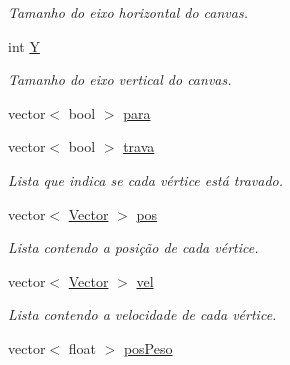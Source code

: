 \begin{DoxyCompactItemize}
\begin{DoxyCompactList}\small\item\em Tamanho do eixo horizontal do canvas. \end{DoxyCompactList}\item 
\mbox{\label{classGraphDisplay_a25ae3eec2c8103a827aefcd5a44be825}} 
int \hyperlink{classGraphDisplay_a25ae3eec2c8103a827aefcd5a44be825}{Y}
\begin{DoxyCompactList}\small\item\em Tamanho do eixo vertical do canvas. \end{DoxyCompactList}\item 
vector$<$ bool $>$ \hyperlink{classGraphDisplay_aa9c12d024cc689f6be699e2028e60d83}{para}
\item 
\mbox{\label{classGraphDisplay_a7311fa3063d875c6835829f001967b39}} 
vector$<$ bool $>$ \hyperlink{classGraphDisplay_a7311fa3063d875c6835829f001967b39}{trava}
\begin{DoxyCompactList}\small\item\em Lista que indica se cada vértice está travado. \end{DoxyCompactList}\item 
\mbox{\label{classGraphDisplay_ae82258bda174a54431d584c41a7a0056}} 
vector$<$ \hyperlink{classVector}{Vector} $>$ \hyperlink{classGraphDisplay_ae82258bda174a54431d584c41a7a0056}{pos}
\begin{DoxyCompactList}\small\item\em Lista contendo a posição de cada vértice. \end{DoxyCompactList}\item 
\mbox{\label{classGraphDisplay_adba96d8bb8a10d61aa8cff8de4148bd4}} 
vector$<$ \hyperlink{classVector}{Vector} $>$ \hyperlink{classGraphDisplay_adba96d8bb8a10d61aa8cff8de4148bd4}{vel}
\begin{DoxyCompactList}\small\item\em Lista contendo a velocidade de cada vértice. \end{DoxyCompactList}\item 
vector$<$ float $>$ \hyperlink{classGraphDisplay_a5e623e031f43e01713d991c29848cd96}{pos\+Peso}
\item 
\mbox{\label{classGraphDisplay_a4b1af3eec6797feb7cde718c3f02ce13}} 

\end{DoxyCompactItemize}
